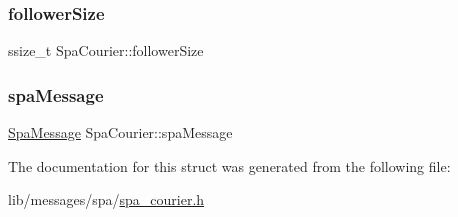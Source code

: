 \subsubsection{\texorpdfstring{follower\+Size}{followerSize}}
{\footnotesize\ttfamily ssize\+\_\+t Spa\+Courier\+::follower\+Size}

\mbox{\label{structSpaCourier_a6121a451925b18b20a5ee30669fcf46c}} 
\subsubsection{\texorpdfstring{spa\+Message}{spaMessage}}
{\footnotesize\ttfamily \hyperlink{structSpaMessage}{Spa\+Message} Spa\+Courier\+::spa\+Message}



The documentation for this struct was generated from the following file\+:\begin{DoxyCompactItemize}
\item 
lib/messages/spa/\hyperlink{spa__courier_8h}{spa\+\_\+courier.\+h}\end{DoxyCompactItemize}
